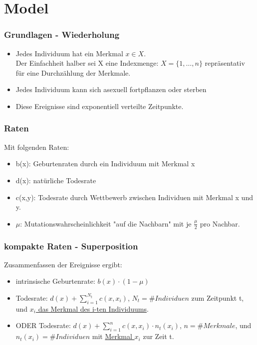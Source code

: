 \documentclass{beamer}
\begin{document}
\section{Model}
	\begin{frame}
		\frametitle{Grundlagen - Wiederholung}
		\begin{itemize}
			\item Jedes Individuum hat ein Merkmal $ x \in X $. \\
			Der Einfachheit halber sei X eine Indexmenge: $ X = \{1,\dots, n\} $ repräsentativ für eine Durchzählung der Merkmale.
			\pause
			\item Jedes Individuum kann sich asexuell fortpflanzen oder sterben
			\pause
			\item Diese Ereignisse sind exponentiell verteilte Zeitpunkte. 
		\end{itemize}		
	\end{frame}
	\begin{frame}
		\frametitle{Raten}
		Mit folgenden Raten:
		\begin{itemize}
			\item b(x): Geburtenraten durch ein Individuum mit Merkmal x
			\pause
			\item d(x): natürliche Todesrate
			\pause
			\item c(x,y): Todesrate durch Wettbewerb zwischen Individuen mit Merkmal x und y.
			\pause
			\item $ \mu $: Mutationswahrscheinlichkeit "{}auf die Nachbarn"{} mit je $ \frac{\mu}{2} $ pro Nachbar. 
		\end{itemize}
	\end{frame}
	\begin{frame}
		\frametitle{kompakte Raten - Superposition}
		Zusammenfassen der Ereignisse ergibt:
		\begin{itemize}
			\item intrinsische Geburtenrate: $ b(x) \cdot (1 - \mu) $
			\pause
		 	\item Todesrate: $ d(x) + \sum_{i=1}^{N_t} c(x,x_i) $, $ N_t = \#Individuen$ zum Zeitpunkt t, und \underline{$ x_i $ das Merkmal des i-ten Individuums}.
		 	\pause
		 	\item ODER Todesrate: $ d(x) + \sum_{i=1}^{n} c(x,x_i) \cdot n_t(x_i) $, $ n = \#Merkmale$, und $ n_t(x_i) = \#Individuen $ mit \underline{Merkmal $ x_i $} zur Zeit t.
		\end{itemize}
	\end{frame}	
\end{document}
